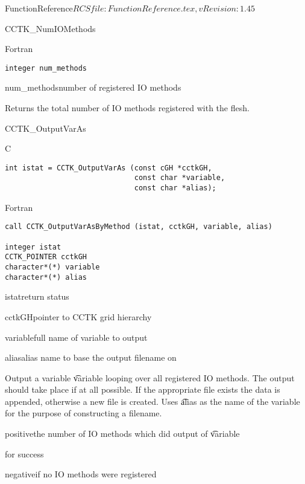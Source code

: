 \begin{cactuspart}{5}{FunctionReference}{$RCSfile: FunctionReference.tex,v $}{$Revision: 1.45 $}
\begin{FunctionDescription}{CCTK\_NumIOMethods}
\begin{Synopsis}{Fortran}
\begin{verbatim}
integer num_methods
\end{verbatim}
\end{Synopsis}
\begin{Parameter}{num\_methods}number of registered IO methods\end{Parameter}
\begin{Discussion}
Returns the total number of IO methods registered with the flesh.
\end{Discussion}
\end{FunctionDescription}


\begin{FunctionDescription}{CCTK\_OutputVarAs}
\label{CCTK-OutputVarAs}
\begin{Synopsis}{C}
\begin{verbatim}
int istat = CCTK_OutputVarAs (const cGH *cctkGH,
                              const char *variable,
                              const char *alias);
\end{verbatim}
\end{Synopsis}
\begin{Synopsis}{Fortran}
\begin{verbatim}
call CCTK_OutputVarAsByMethod (istat, cctkGH, variable, alias)

integer istat
CCTK_POINTER cctkGH
character*(*) variable
character*(*) alias
\end{verbatim}
\end{Synopsis}
\begin{Parameter}{istat}return status\end{Parameter}
\begin{Parameter}{cctkGH}pointer to CCTK grid hierarchy\end{Parameter}
\begin{Parameter}{variable}full name of variable to output\end{Parameter}
\begin{Parameter}{alias}alias name to base the output filename on\end{Parameter}
\begin{Discussion}
Output a variable {\t variable} looping over all registered IO methods.
The output should take place if at all possible.
If the appropriate file exists the data is appended, otherwise a new
file is created. Uses {\t alias} as the name of the variable for the purpose
of constructing a filename.
\end{Discussion}
\begin{Error}{positive}the number of IO methods which did output of {\t variable}\end{Error}
\begin{Error}{0}for success\end{Error}
\begin{Error}{negative}if no IO methods were registered\end{Error}
\end{FunctionDescription}



\end{cactuspart}
